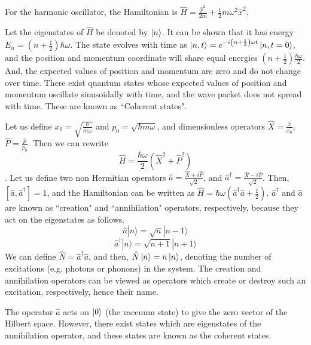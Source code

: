 \documentclass[12pt, twoside]{article}
\begin{document}
For the harmonic oscillator, the Hamiltonian is $\hat{H} = \frac{\hat{p}^2}{2m} + \frac{1}{2}m \omega^2 {\hat{x}}^2$.


Let the eigenstates of $\hat{H}$ be denoted by $\ket{n}$. It can be shown \cite{cohen_tannoudji} that it has energy $E_n = (n+\frac{1}{2}) \hbar\omega$. The state evolves with time as $\ket{n,t} = e ^ { -i \left( n + \frac { 1 } { 2 } \right) \omega t } \ket{n,t=0}$, and the position and momentum coordinate will share equal energies $(n+\frac{1}{2}) \frac{\hbar\omega}{2}$. And, the expected values of position and momentum are zero and do not change over time.
There exist quantum states whose expected values of position and momentum oscillate sinusoidally with time, and the wave packet does not spread with time. These are known as ``Coherent states".


Let us define $x_0 = \sqrt{\frac{\hbar}{m\omega}}$ and $p_0 = \sqrt{\hbar m \omega}$, and dimensionless operators $\hat{X} = \frac{\hat{x}}{x_0}$,$\hat{P} = \frac{\hat{p}}{p_0}$. Then we can rewrite \begin{equation}\label{eq:Hamiltonian}\hat{H} = \frac{\hbar\omega}{2}({\hat{X}}^2 + {\hat{P}}^2)\end{equation}. Let us define two non Hermitian operators $\hat{a} = \frac{\hat{X} + i \hat{P}}{\sqrt{2}}$, and ${\hat{a}}^\dagger = \frac{\hat{X} - i \hat{P}}{\sqrt{2}}$. Then, $[\hat{a},\hat{a}^\dagger] = 1$, and the Hamiltonian can be written as $\hat{H} = \hbar\omega( \hat{a}^\dagger \hat{a} + \frac{1}{2})$.
$\hat{a}^\dagger$ and $\hat{a}$ are known as ``creation" and ``annihilation" operators, respectively, because they act on the eigenstates as follows. 
\begin{equation}\label{eq:a} { \hat{a} | n \rangle = \sqrt { n } | n - 1 \rangle } \end{equation}
\begin{equation} \label{eq:adagger}{ \hat{a} ^ { \dagger } | n \rangle = \sqrt { n + 1 } | n + 1 \rangle }\end{equation} 
We can define $\hat{N} = \hat{a}^\dagger\hat{a}$, and then, $\hat{N} \ket{n} = n\ket{n}$, denoting the number of excitations (e.g. photons or phonons) in the system. The creation and annihilation operators can be viewed as operators which create or destroy such an excitation, respectively, hence their name.

The operator $\hat{a}$ acts on $\ket{0}$ (the vaccuum state) to give the zero vector of the Hilbert space. However, there exist states which are eigenstates of the annihilation operator, and these states are known as the coherent states. \cite{wikipedia_coherent}
\end{document}
